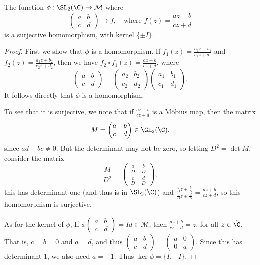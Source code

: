 \begin{proposition}
	The function $\phi : \SL_2(\C) \rightarrow \mathcal{M}$ where 
	$$
		\begin{pmatrix}
			a & b \\ c & d
		\end{pmatrix} \longmapsto f, \quad \text{where } f(z) = \frac{az + b}{cz + d} 
	$$
	is a surjective homomorphism, with kernel $\{\pm I\}$.
\end{proposition}
\begin{proof}
	First we show that $\phi$ is a homomorphism. If $f_1(z) = \frac{a_1 z + b_1}{c_1 z + d_1}$ and $f_2(z) = \frac{a_2 z + b_2}{c_2 z + d_2}$, then we have $f_2 \circ f_1(z) = \frac{az + b}{cz + d}$, where
	$$
	\begin{pmatrix}
		a & b \\
		c & d
		\end{pmatrix}=\begin{pmatrix}
		a_{2} & b_{2} \\
		c_2 & d_{2}
		\end{pmatrix}\begin{pmatrix}
		a_{1} & b_{1} \\
		c_{1} & d_{1}
		\end{pmatrix}.
	$$
	It follows directly that $\phi$ is a homomorphism.

	To see that it is surjective, we note that if $\frac{az + b}{cz + d}$ is a Möbius map, then the matrix
	$$
	M = \begin{pmatrix}
		a & b \\
		c & d
		\end{pmatrix} \in \GL_2(\C),
	$$
	since $ad - bc \neq 0$. But the determinant may not be zero, so letting $D^2= \det M$, consider the matrix
	$$
	\frac{M}{D^2} = \begin{pmatrix}
		\frac{a}{D} & \frac{b}{D} \\
		\frac{c}{D} & \frac{d}{D}
		\end{pmatrix},
	$$
	this has determinant one (and thus is in $\SL_2(\C)$) and $\frac{\frac{a}{D}z + \frac{b}{D}}{\frac{c}{D}z + \frac{d}{D}} = \frac{az + b}{cz + d}$, so this homomorphism is surjective.

	As for the kernel of $\phi$, If $\phi\begin{pmatrix}
		a & b \\ c & d
	\end{pmatrix} = Id \in \mathcal{M}$, then $\frac{az + b}{cz + d} = z$, for all $z \in \hat{\C}$. That is, $c = b = 0$ and $a = d$, and thus $\begin{pmatrix}
		a & b \\ c & d
	\end{pmatrix} = \begin{pmatrix}
		a & 0 \\ 0 & a
	\end{pmatrix}$. Since this has determinant 1, we also need $a = \pm  1$. Thus $\ker \phi = \{I, -I\}$.
\end{proof}

